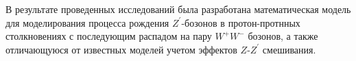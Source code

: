 В результате проведенных исследований была разработана
математическая модель для моделирования процесса рождения ${Z}^{\prime}$-бозонов в протон-протнных столкновениях с последующим распадом на пару ${W}^{+}{W}^{-}$ бозонов, а также отличающуюся от известных моделей учетом эффектов $Z$-${Z}^{\prime}$ смешивания.